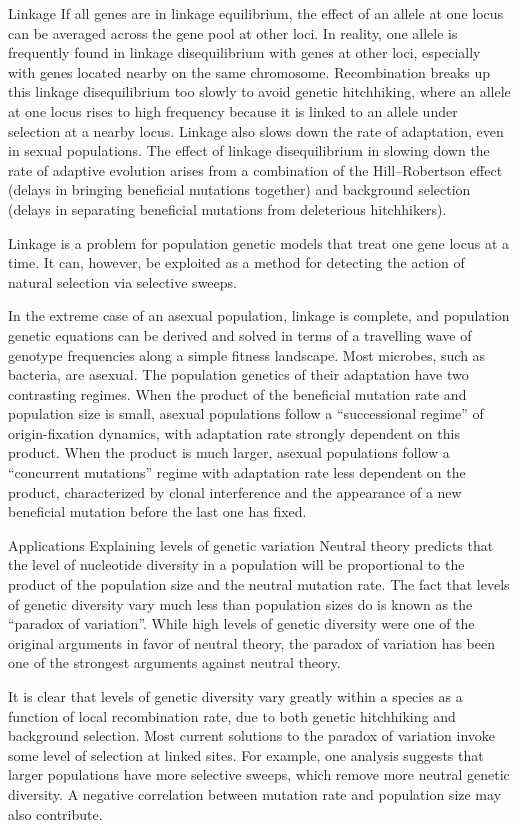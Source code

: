Linkage
If all genes are in linkage equilibrium, the effect of an allele at one locus can be averaged across the gene pool at other loci. In reality, one allele is frequently found in linkage disequilibrium with genes at other loci, especially with genes located nearby on the same chromosome. Recombination breaks up this linkage disequilibrium too slowly to avoid genetic hitchhiking, where an allele at one locus rises to high frequency because it is linked to an allele under selection at a nearby locus. Linkage also slows down the rate of adaptation, even in sexual populations. The effect of linkage disequilibrium in slowing down the rate of adaptive evolution arises from a combination of the Hill--Robertson effect (delays in bringing beneficial mutations together) and background selection (delays in separating beneficial mutations from deleterious hitchhikers).

Linkage is a problem for population genetic models that treat one gene locus at a time. It can, however, be exploited as a method for detecting the action of natural selection via selective sweeps.

In the extreme case of an asexual population, linkage is complete, and population genetic equations can be derived and solved in terms of a travelling wave of genotype frequencies along a simple fitness landscape. Most microbes, such as bacteria, are asexual. The population genetics of their adaptation have two contrasting regimes. When the product of the beneficial mutation rate and population size is small, asexual populations follow a ``successional regime'' of origin-fixation dynamics, with adaptation rate strongly dependent on this product. When the product is much larger, asexual populations follow a ``concurrent mutations'' regime with adaptation rate less dependent on the product, characterized by clonal interference and the appearance of a new beneficial mutation before the last one has fixed.

Applications
Explaining levels of genetic variation
Neutral theory predicts that the level of nucleotide diversity in a population will be proportional to the product of the population size and the neutral mutation rate. The fact that levels of genetic diversity vary much less than population sizes do is known as the ``paradox of variation''. While high levels of genetic diversity were one of the original arguments in favor of neutral theory, the paradox of variation has been one of the strongest arguments against neutral theory.

It is clear that levels of genetic diversity vary greatly within a species as a function of local recombination rate, due to both genetic hitchhiking and background selection. Most current solutions to the paradox of variation invoke some level of selection at linked sites. For example, one analysis suggests that larger populations have more selective sweeps, which remove more neutral genetic diversity. A negative correlation between mutation rate and population size may also contribute.

